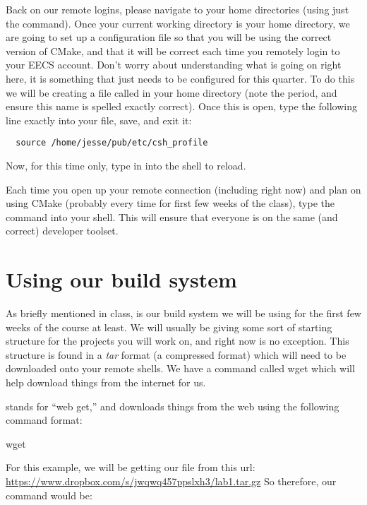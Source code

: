 \documentclass{tufte-handout}
\begin{document}
Back on our remote logins, please navigate to your home directories
(using just the  command). Once your current working
directory is your home directory, we are going to set up a configuration
file so that you will be using the correct version of CMake, and that it
will be correct each time you remotely login to your EECS account. Don't
worry about understanding what is going on right here, it is something
that just needs to be configured for this quarter. To do this we will be
creating a file called  in your home directory (note
the period, and ensure this name is spelled exactly
correct). Once this is open, type
the following line exactly into your file, save, and exit it:

\begin{verbatim}
  source /home/jesse/pub/etc/csh_profile
\end{verbatim}

Now, for this time only, type in  into the shell to
reload.

Each time you open up your remote connection (including right now) and
plan on using CMake (probably every time for first few weeks of the
class), type the  command into your shell.  This will
ensure that everyone is on the same (and correct) developer toolset.

\section{Using our build system}

As briefly mentioned in class,  is our build system we
will be using for the first few weeks of the course at least.  We will
usually be giving some sort of starting structure for the projects you
will work on, and right now is no exception.  This structure is found in
a \emph{tar} format (a compressed format) which will need to be
downloaded onto your remote shells.  We have a command called wget which
will help download things from the internet for us.

 stands for ``web get,'' and downloads things from the web using the
following command format:

\begin{CmdLine}
  \prompt wget 
\end{CmdLine}

For this example, we will be getting our file from this url:
\url{https://www.dropbox.com/s/jwqwq457ppslxh3/lab1.tar.gz}
So therefore, our command would be:
\end{document}
